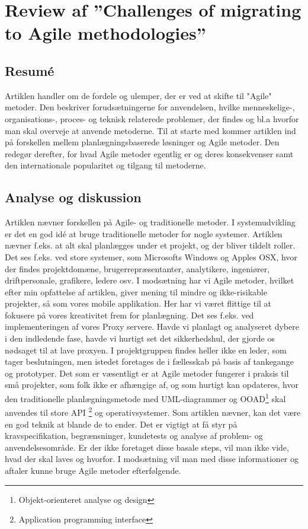 \documentclass[12pt]{article}
\begin{document}
\section {Review af ''Challenges of migrating to Agile methodologies'' \cite{articel} }

\subsection{Resumé}

Artiklen handler om de fordele og ulemper, der er ved at skifte til "Agile" metoder. Den beskriver forudsætningerne for anvendelsen, hvilke menneskelige-, organisations-, proces- og teknisk relaterede problemer, der findes og bl.a hvorfor man skal overveje at anvende metoderne. Til at starte med kommer artiklen ind på forskellen mellem planlægningsbaserede løsninger og Agile metoder. Den redegør derefter, for hvad Agile metoder egentlig er og deres konsekvenser samt den internationale popularitet og tilgang til metoderne.

\subsection{Analyse og diskussion}

Artiklen nævner forskellen på Agile- og traditionelle metoder. I systemudvikling er det en god idé at bruge traditionelle metoder for nogle systemer. Artiklen nævner f.eks. at alt skal planlægges under et projekt, og der bliver tildelt roller. Det ses f.eks. ved store systemer, som Microsofts Windows og Apples OSX, hvor der findes projektdomæne, brugerrepræsentanter, analytikere, ingeniører, driftpersonale, grafikere, ledere osv. I modsætning har vi Agile metoder, hvilket efter min opfattelse af artiklen, giver mening til mindre og ikke-risikable projekter, så som vores mobile applikation. Her har vi været flittige til at fokusere på vores kreativitet frem for planlægning. Det ses f.eks. ved implementeringen af vores Proxy servere. Havde vi planlagt og analyseret dybere i den indledende fase, havde vi hurtigt set det sikkerhedshul, der gjorde os nødsaget til at lave proxyen. I projektgruppen findes heller ikke en leder, som tager beslutningen, men istedet foretages de i fællesskab på basis af tankegange og prototyper. Det som er væsentligt er at Agile metoder fungerer i praksis til små projekter, som folk ikke er afhængige af, og som hurtigt kan opdateres, hvor den traditionelle planlægningsmetode med UML-diagrammer og OOAD\footnote{Objekt-orienteret analyse og design} skal anvendes til store API \footnote{Application programming interface} og operativsystemer. Som artiklen nævner, kan det være en god teknik at blande de to ender. Det er vigtigt at få styr på kravspecifikation, begrænsninger, kundetests og analyse af problem- og anvendelsesområde. Er der ikke foretaget disse basale steps, vil man ikke vide, hvad der skal laves og hvorfor. I modsætning vil man med disse informationer og aftaler kunne bruge Agile metoder efterfølgende. 
\end{document}
